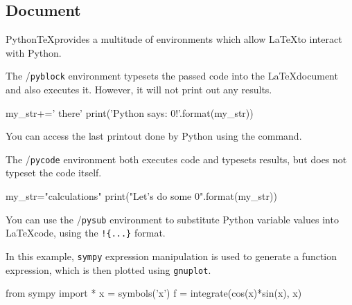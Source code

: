 \documentclass{article}
\begin{document}
\subsection*{Document}
\begin{latex}
Python\TeX provides a multitude of environments which allow \LaTeX to interact with Python.

The \texttt{\pyb}/\texttt{pyblock} environment typesets the passed code into the \LaTeX document and also executes it. However, it will not print out any results.


\begin{pyblock}
	my_str+=' there'
	print('Python says: {0}!'.format(my_str))
\end{pyblock}

You can access the last printout done by Python using the \texttt{\printpythontex} command.

\printpythontex

The \texttt{\pyc}/\texttt{pycode} environment both executes code and typesets results, but does not typeset the code itself.


\begin{pycode}
	my_str="calculations"
	print("Let's do some {0}".format(my_str))
\end{pycode}

You can use the \texttt{\pys}/\texttt{pysub} environment to substitute Python variable values into \LaTeX code, using the \verb|!{...}| format.

In this example, \verb|sympy| expression manipulation is used to generate a function expression, which is then plotted using \verb|gnuplot|.

\begin{pycode}
	from sympy import *
	x = symbols('x')
	f = integrate(cos(x)*sin(x), x)
\end{pycode}

\begin{pysub}
\end{pysub}


\end{latex}
\end{document}
